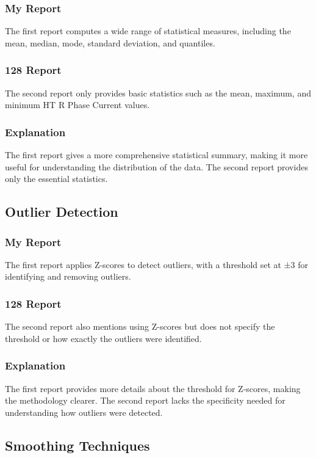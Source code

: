 \subsubsection*{My Report}
The first report computes a wide range of statistical measures, including the mean, median, mode, standard deviation, and quantiles.

\subsubsection*{128 Report}
The second report only provides basic statistics such as the mean, maximum, and minimum HT R Phase Current values.

\subsubsection*{Explanation}
The first report gives a more comprehensive statistical summary, making it more useful for understanding the distribution of the data. The second report provides only the essential statistics.

\subsection*{Outlier Detection}

\subsubsection*{My Report}
The first report applies Z-scores to detect outliers, with a threshold set at ±3 for identifying and removing outliers.

\subsubsection*{128 Report}
The second report also mentions using Z-scores but does not specify the threshold or how exactly the outliers were identified.

\subsubsection*{Explanation}
The first report provides more details about the threshold for Z-scores, making the methodology clearer. The second report lacks the specificity needed for understanding how outliers were detected.

\subsection*{Smoothing Techniques}

